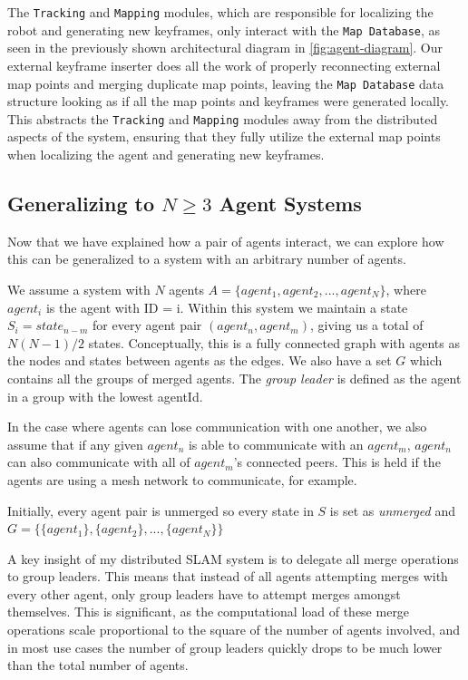 The \texttt{Tracking} and \texttt{Mapping} modules, which are responsible for localizing the robot and generating new keyframes, only interact with the \texttt{Map Database}, as seen in the previously shown architectural diagram in \autoref{fig:agent-diagram}. Our external keyframe inserter does all the work of properly reconnecting external map points and merging duplicate map points, leaving the \texttt{Map Database} data structure looking as if all the map points and keyframes were generated locally. This abstracts the \texttt{Tracking} and \texttt{Mapping} modules away from the distributed aspects of the system, ensuring that they fully utilize the external map points when localizing the agent and generating new keyframes.

\subsection{Generalizing to $N \geq 3$ Agent Systems}
\label{sec:generalizing-to-n-geq-3-agent-systems}
Now that we have explained how a pair of agents interact, we can explore how this can be generalized to a system with an arbitrary number of agents.

We assume a system with $N$ agents $A=\{agent_1, agent_2, ..., agent_N\}$, where $agent_i$ is the agent with ID = i. Within this system we maintain a state $S_i=state_{n-m}$ for every agent pair $(agent_n, agent_m)$, giving us a total of $N(N-1)/2$ states. Conceptually, this is a fully connected graph with agents as the nodes and states between agents as the edges. We also have a set $G$ which contains all the groups of merged agents. The \textit{group leader} is defined as the agent in a group with the lowest agentId.

In the case where agents can lose communication with one another, we also assume that if any given $agent_n$ is able to communicate with an $agent_m$, $agent_n$ can also communicate with all of $agent_m$'s connected peers. This is held if the agents are using a mesh network to communicate, for example.

Initially, every agent pair is unmerged so every state in $S$ is set as \textit{unmerged} and $G=\{\{agent_1\}, \{agent_2\}, ..., \{agent_N\}\}$

A key insight of my distributed SLAM system is to delegate all merge operations to group leaders. This means that instead of all agents attempting merges with every other agent, only group leaders have to attempt merges amongst themselves. This is significant, as the computational load of these merge operations scale proportional to the square of the number of agents involved, and in most use cases the number of group leaders quickly drops to be much lower than the total number of agents.

